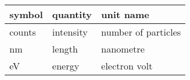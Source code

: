 \renewcommand{\arraystretch}{1.2}
\noindent 
\begin{tabular}{l l l} 
    \toprule		
    \textbf{symbol} & \textbf{quantity} & \textbf{unit name}\\
    \midrule 
    counts & intensity & number of particles\\
    \si{\nano\metre} & length & nanometre\\
    \si{\electronvolt} & energy	& electron volt\\
    \bottomrule
\end{tabular}